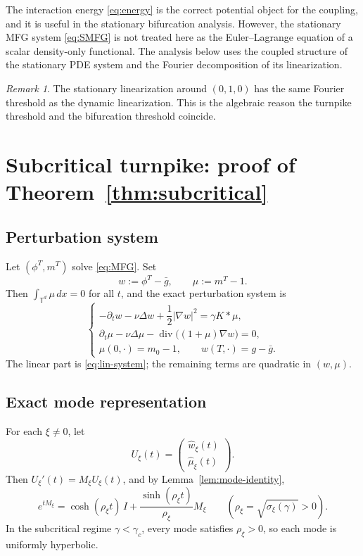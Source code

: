 \documentclass[11pt]{amsart}
\theoremstyle{definition}
\theoremstyle{remark}
\newtheorem{remark}[theorem]{Remark}
\newcommand{\Td}{\mathbb{T}^d}
\newcommand{\phiT}{\phi^T}
\newcommand{\mT}{m^T}
\newcommand{\gamc}{\gamma_c}
\newcommand{\Div}{\operatorname{div}}
\newcommand{\grad}{\nabla}
\begin{document}
The interaction energy \eqref{eq:energy} is the correct potential object for the coupling, and it is useful in the stationary bifurcation analysis. However, the stationary MFG system \eqref{eq:SMFG} is not treated here as the Euler--Lagrange equation of a scalar density-only functional. The analysis below uses the coupled structure of the stationary PDE system and the Fourier decomposition of its linearization.

\begin{remark}
The stationary linearization around $(0,1,0)$ has the same Fourier threshold as the dynamic linearization. This is the algebraic reason the turnpike threshold and the bifurcation threshold coincide.
\end{remark}

\section{Subcritical turnpike: proof of Theorem~\ref{thm:subcritical}}
\label{sec:subcritical-proof}

\subsection{Perturbation system}
\label{sub:perturbation-system}

Let $(\phiT,\mT)$ solve \eqref{eq:MFG}. Set
\[
w:=\phiT-\bar g,\qquad \mu:=\mT-1.
\]
Then $\int_{\Td}\mu\,dx=0$ for all $t$, and the exact perturbation system is
\begin{equation}
\label{eq:perturb-exact}
\begin{cases}
-\partial_t w-\nu\Delta w+\dfrac12|\grad w|^2=\gamma K*\mu,\\[3pt]
\partial_t \mu-\nu\Delta\mu-\Div\bigl((1+\mu)\grad w\bigr)=0,\\[3pt]
\mu(0,\cdot)=m_0-1,\qquad w(T,\cdot)=g-\bar g.
\end{cases}
\end{equation}
The linear part is \eqref{eq:lin-system}; the remaining terms are quadratic in $(w,\mu)$.

\subsection{Exact mode representation}
\label{sub:exact-representation}

For each $\xi\neq 0$, let
\[
U_\xi(t)=
\begin{pmatrix}
\widehat w_\xi(t)\\
\widehat \mu_\xi(t)
\end{pmatrix}.
\]
Then $U_\xi'(t)=M_\xi U_\xi(t)$, and by Lemma~\ref{lem:mode-identity},
\[
e^{tM_\xi}
=
\cosh(\rho_\xi t)\,I+\frac{\sinh(\rho_\xi t)}{\rho_\xi}M_\xi
\qquad (\rho_\xi=\sqrt{\sigma_\xi(\gamma)} > 0).
\]
In the subcritical regime $\gamma<\gamc$, every mode satisfies $\rho_\xi>0$, so each mode is uniformly hyperbolic.
\end{document}
